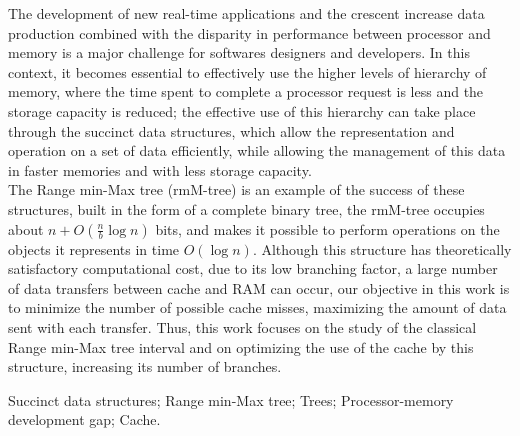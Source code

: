 The development of new real-time applications and the crescent increase data production combined with the disparity in performance between 
processor and memory is a major challenge for softwares designers and developers.
In this context, it becomes essential to effectively use the higher levels of hierarchy of memory, where the time spent to complete a processor 
request is less and the storage capacity is reduced;  the effective use of this hierarchy can take place through the succinct data structures, 
which allow the representation and operation on a set of data efficiently,  while allowing the management of this data in faster memories and with 
less storage capacity.\\
The Range min-Max tree (rmM-tree) is an example of the success of these structures, built in the form of a complete binary tree, the rmM-tree occupies 
about $n + O (\frac {n} {b} \log n)$ bits, and makes it possible to perform operations on the objects it represents in time $O(\log n)$. 
Although this structure has theoretically satisfactory computational cost, due to its low branching factor, a large number of data transfers between 
cache and RAM can occur, our objective in this work is to minimize the number of possible cache misses, maximizing the amount of data sent with each 
transfer. 
Thus, this work focuses on the study of the classical Range min-Max tree interval and on optimizing the use of the cache by this structure, 
increasing its number of branches.

\begin{keywords}
Succinct data structures; Range min-Max tree; Trees; Processor-memory development gap; Cache.
\end{keywords}